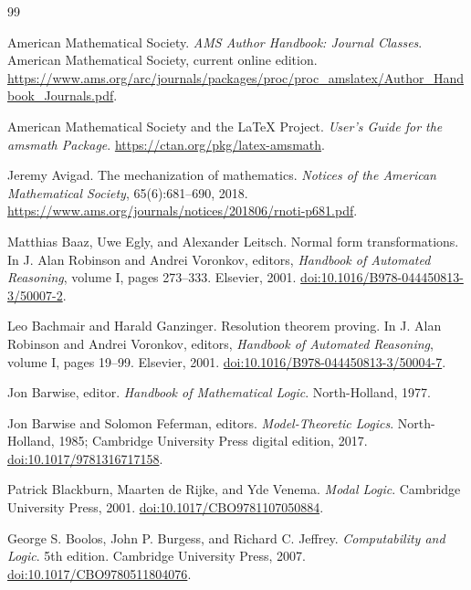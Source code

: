 \backmatter

\cleardoublepage
{}
{}
\begin{thebibliography}{99}

American Mathematical Society.
\emph{AMS Author Handbook: Journal Classes}.
American Mathematical Society, current online edition.
\url{https://www.ams.org/arc/journals/packages/proc/proc_amslatex/Author_Handbook_Journals.pdf}.

American Mathematical Society and the \LaTeX{} Project.
\emph{User's Guide for the amsmath Package}.
\url{https://ctan.org/pkg/latex-amsmath}.

Jeremy Avigad.
The mechanization of mathematics.
\emph{Notices of the American Mathematical Society}, 65(6):681--690, 2018.
\url{https://www.ams.org/journals/notices/201806/rnoti-p681.pdf}.

Matthias Baaz, Uwe Egly, and Alexander Leitsch.
Normal form transformations.
In J. Alan Robinson and Andrei Voronkov, editors,
\emph{Handbook of Automated Reasoning}, volume I, pages 273--333.
Elsevier, 2001.
\href{https://doi.org/10.1016/B978-044450813-3/50007-2}{doi:10.1016/B978-044450813-3/50007-2}.

Leo Bachmair and Harald Ganzinger.
Resolution theorem proving.
In J. Alan Robinson and Andrei Voronkov, editors,
\emph{Handbook of Automated Reasoning}, volume I, pages 19--99.
Elsevier, 2001.
\href{https://doi.org/10.1016/B978-044450813-3/50004-7}{doi:10.1016/B978-044450813-3/50004-7}.

Jon Barwise, editor.
\emph{Handbook of Mathematical Logic}.
North-Holland, 1977.

Jon Barwise and Solomon Feferman, editors.
\emph{Model-Theoretic Logics}.
North-Holland, 1985; Cambridge University Press digital edition, 2017.
\href{https://doi.org/10.1017/9781316717158}{doi:10.1017/9781316717158}.

Patrick Blackburn, Maarten de Rijke, and Yde Venema.
\emph{Modal Logic}.
Cambridge University Press, 2001.
\href{https://doi.org/10.1017/CBO9781107050884}{doi:10.1017/CBO9781107050884}.

George S. Boolos, John P. Burgess, and Richard C. Jeffrey.
\emph{Computability and Logic}. 5th edition.
Cambridge University Press, 2007.
\href{https://doi.org/10.1017/CBO9780511804076}{doi:10.1017/CBO9780511804076}.


\end{thebibliography}
